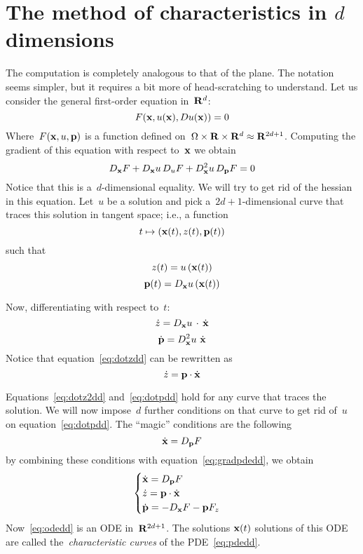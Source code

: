 \clearpage
\section{The method of characteristics in $d$ dimensions}

The computation is completely analogous to that of the plane.  The notation
seems simpler, but it requires a bit more of head-scratching to understand.
Let us consider the general first-order equation in~$\mathbf{R}^d$:
\begin{equation}\label{eq:pdedd}
	F(\mathbf{x}, u(\mathbf{x}), Du(\mathbf{x})) = 0
\end{equation}
Where~$F(\mathbf{x},u,\mathbf{p})$ is a function defined
on~$\Omega\times\mathbf{R}\times\mathbf{R}^d\approx\mathbf{R}^{2d+1}$.  Computing the gradient of
this equation with respect to~$\mathbf{x}$ we obtain
\begin{equation}\label{eq:gradpdedd}
	D_{\mathbf{x}}F + D_{\mathbf{x}}u\,D_uF + D^2_{\mathbf{x}}u\,D_{\mathbf{p}}F = 0
\end{equation}
Notice that this is a~$d$-dimensional equality.  We will try to get rid of
the hessian in this equation.  Let~$u$ be a solution and pick
a~$2d+1$-dimensional curve that traces this solution in tangent space; i.e.,
a function
\begin{equation*}
	t\mapsto\left(
		\mathbf{x}(t),z(t),\mathbf{p}(t)
	\right)
\end{equation*}
such that
\begin{equation}
	z(t)=u\left(\mathbf{x}(t)\right)
\end{equation}
\begin{equation}
	\mathbf{p}(t)=D_{\mathbf{x}}u\left(\mathbf{x}(t)\right)
\end{equation}

Now, differentiating with respect to~$t$:
\begin{equation}\label{eq:dotzdd}
	\dot z=D_{\mathbf{x}}u\,\cdot\,\dot{\mathbf{x}}
\end{equation}
\begin{equation}\label{eq:dotpdd}
	\dot{\mathbf{p}}=D^2_{\mathbf{x}}u\  \dot{\mathbf{x}}
\end{equation}
Notice that equation~\eqref{eq:dotzdd} can be rewritten as
\begin{equation}\label{eq:dotz2dd}\dot z=\mathbf{p}\cdot\dot{\mathbf{x}}\end{equation}

Equations~\eqref{eq:dotz2dd} and~\eqref{eq:dotpdd} hold for any
curve that traces the solution.  We will now impose~$d$ further
conditions on that curve to get rid of~$u$ on equation~\eqref{eq:dotpdd}.
The ``magic'' conditions are the following
\begin{equation}
	\dot{\mathbf{x}} = D_{\mathbf{p}}F
\end{equation}
by combining these conditions with equation~\eqref{eq:gradpdedd}, we obtain
\begin{equation}\label{eq:odedd}
	\begin{cases}
		\dot{\mathbf{x}} = D_{\mathbf{p}}F \\
		\dot z = \mathbf{p}\cdot\dot{\mathbf{x}} \\
		\dot{\mathbf{p}} = -D_{\mathbf{x}}F - \mathbf{p} F_z \\
	\end{cases}
\end{equation}
Now~\eqref{eq:odedd} is an ODE in~$\mathbf{R}^{2d+1}$.
The solutions $\mathbf{x}(t)$ solutions
of this ODE are called the~\emph{characteristic curves} of the
PDE~\eqref{eq:pdedd}.


